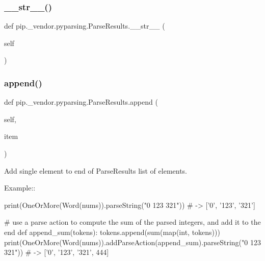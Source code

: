 \subsubsection{\texorpdfstring{\+\_\+\+\_\+str\+\_\+\+\_\+()}{\_\_str\_\_()}}
{\footnotesize\ttfamily def pip.\+\_\+vendor.\+pyparsing.\+Parse\+Results.\+\_\+\+\_\+str\+\_\+\+\_\+ (\begin{DoxyParamCaption}\item[{}]{self }\end{DoxyParamCaption})}

\mbox{\label{classpip_1_1__vendor_1_1pyparsing_1_1ParseResults_a31699d5a98e62c36e2701d0d721a6e1c}} 
\subsubsection{\texorpdfstring{append()}{append()}}
{\footnotesize\ttfamily def pip.\+\_\+vendor.\+pyparsing.\+Parse\+Results.\+append (\begin{DoxyParamCaption}\item[{}]{self,  }\item[{}]{item }\end{DoxyParamCaption})}

\begin{DoxyVerb}Add single element to end of ParseResults list of elements.

Example::

    print(OneOrMore(Word(nums)).parseString("0 123 321")) # -> ['0', '123', '321']

    # use a parse action to compute the sum of the parsed integers, and add it to the end
    def append_sum(tokens):
tokens.append(sum(map(int, tokens)))
    print(OneOrMore(Word(nums)).addParseAction(append_sum).parseString("0 123 321")) # -> ['0', '123', '321', 444]
\end{DoxyVerb}
 \mbox{\label{classpip_1_1__vendor_1_1pyparsing_1_1ParseResults_a2a26c1c250002905345967e6cc0bd632}} 
